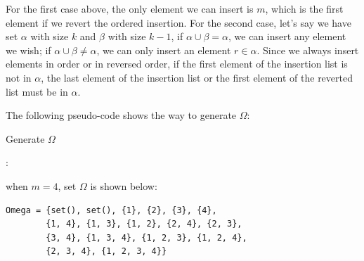\documentclass[11pt]{article}
\begin{document}
For the first case above, the only element we can insert is $m$, which is the first element if we revert the ordered insertion. For the second case, let's say we have set $\alpha$ with size $k$ and $\beta$ with size $k-1$, if $\alpha \cup \beta = \alpha$, we can insert any element we wish; if $\alpha \cup \beta \neq \alpha$, we can only insert an element $r \in \alpha$. Since we always insert elements in order or in reversed order, if the first element of the insertion list is not in $\alpha$, the last element of the insertion list or the first element of the reverted list must be in $\alpha$.

The following pseudo-code shows the way to generate $\Omega$: 

\begin{algorithm}[H] 
    \caption{Generate $\Omega$}
    \label{alg:loop}
    \begin{algorithmic}[1]
    \Ensure{$\Omega$}
                :
                \EndIf
                     
                \EndFor
            \EndFor
        \EndFor
        \State \Return {$\Omega$}
    \end{algorithmic}
\end{algorithm}

when $m=4$, set $\Omega$ is shown below:
\begin{lstlisting}
Omega = {set(), set(), {1}, {2}, {3}, {4}, 
        {1, 4}, {1, 3}, {1, 2}, {2, 4}, {2, 3}, 
        {3, 4}, {1, 3, 4}, {1, 2, 3}, {1, 2, 4}, 
        {2, 3, 4}, {1, 2, 3, 4}}
\end{lstlisting}


\end{document}
